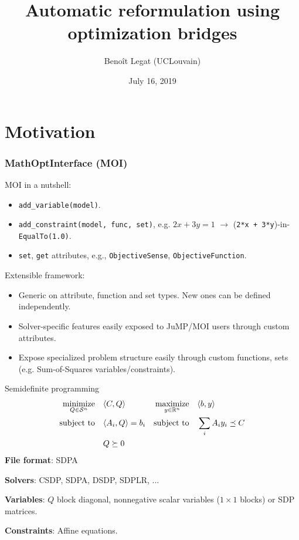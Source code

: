 \documentclass{beamer}
\title{Automatic reformulation using optimization bridges}
\date{July 16, 2019}
\author{Beno\^it Legat (UCLouvain)}
\institute{Los Alamos National Laboratory, 16th July 2019}
\begin{document}
  \maketitle

  \begin{frame}
    \tableofcontents
  \end{frame}

\section{Motivation}

  \begin{frame}[fragile]
    \frametitle{MathOptInterface (MOI)}
    MOI in a nutshell:
    \begin{itemize}
      \item \verb|add_variable(model)|.
      \item \verb|add_constraint(model, func, set)|, e.g. $2x + 3y = 1$ $\to$ (\verb|2*x + 3*y|)-in-\verb|EqualTo(1.0)|.
      \item \verb|set|, \verb|get| attributes, e.g., \verb|ObjectiveSense|, \verb|ObjectiveFunction|.
    \end{itemize}
    Extensible framework:
    \begin{itemize}
      \item \alert{Generic} on attribute, function and set types. New ones can be defined \alert{independently}.
      \item Solver-\alert{specific} features easily exposed to JuMP/MOI users through \alert{custom} attributes.
      \item Expose \alert{specialized} problem structure easily through \alert{custom} functions, sets (e.g. Sum-of-Squares variables/constraints).
    \end{itemize}
  \end{frame}

  \begin{frame}{Semidefinite programming}
    \begin{align*}
      \operatorname*{minimize}_{Q \in \mathcal{S}^n} \quad & \langle C, Q \rangle & \operatorname*{maximize}_{y \in \mathbb{R}^n} \quad & \langle b, y \rangle\\
      \operatorname*{\operatorname*{\text{subject to}}\quad} & \langle A_i, Q \rangle = b_i & \operatorname*{\operatorname*{\text{subject to}}\quad} & \sum_i A_i y_i \preceq C\\
        & Q \succeq 0
    \end{align*}
    \textbf{File format}: SDPA

    \textbf{Solvers}: CSDP, SDPA, DSDP, SDPLR, ...

    \textbf{Variables}: $Q$ block diagonal, nonnegative scalar variables ($1 \times 1$ blocks) or SDP matrices.

    \textbf{Constraints}: Affine equations.
  \end{frame}
\end{document}

